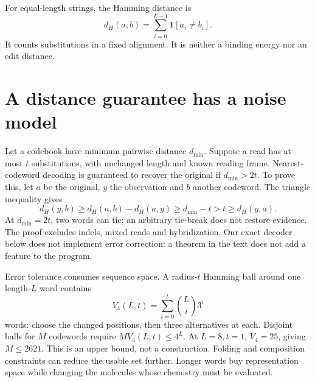 For equal-length strings, the Hamming distance is
\begin{equation}
 d_H(a,b)=\sum_{i=0}^{L-1}\mathbf1[a_i\ne b_i].
\end{equation}
It counts substitutions in a fixed alignment. It is neither a binding energy
nor an edit distance.

\section{A distance guarantee has a noise model}
Let a codebook have minimum pairwise distance $d_{\min}$. Suppose a read has
at most $t$ substitutions, with unchanged length and known reading frame.
Nearest-codeword decoding is guaranteed to recover the original if
$d_{\min}>2t$. To prove this, let $a$ be the original, $y$ the observation
and $b$ another codeword. The triangle inequality gives
\begin{equation}
 d_H(y,b)\ge d_H(a,b)-d_H(a,y)\ge d_{\min}-t>t\ge d_H(y,a).
\end{equation}
At $d_{\min}=2t$, two words can tie; an arbitrary tie-break does not restore
evidence. The proof excludes indels, mixed reads and hybridization. Our exact
decoder below does not implement error correction: a theorem in the text
does not add a feature to the program.

Error tolerance consumes sequence space. A radius-$t$ Hamming ball around
one length-$L$ word contains
\begin{equation}
 V_4(L,t)=\sum_{i=0}^t \binom{L}{i}3^i
\end{equation}
words: choose the changed positions, then three alternatives at each.
Disjoint balls for $M$ codewords require $M V_4(L,t)\le4^L$.
At $L=8,t=1$, $V_4=25$, giving $M\le2621$. This is an upper bound,
not a construction. Folding and composition constraints can reduce the
usable set further. Longer words buy representation space while changing
the molecules whose chemistry must be evaluated.

